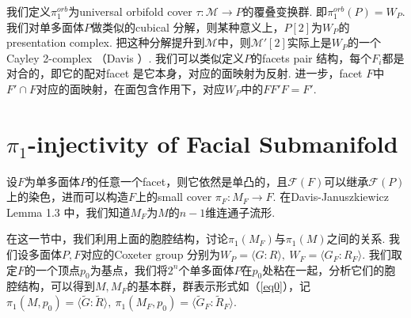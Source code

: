 \documentclass{article}
\theoremstyle{plain}%
\theoremstyle{definition}
\theoremstyle{remark}
\begin{document}
{我们定义$\pi_1^{orb}$为universal orbifold cover $\tau:\mathcal{M}\longrightarrow P$的覆叠变换群.
即$\pi_1^{orb}(P)=W_P$.
我们对单多面体$P$做类似的cubical 分解，则某种意义上，$P[2]$为$W_P$的presentation complex. 把这种分解提升到$\mathcal{M}$中，则$\mathcal{M}'[2]$实际上是$W_P$的一个 Cayley 2-complex （Davis \cite{D2}）. 我们可以类似定义$P$的facets pair 结构，每个$F_i$都是对合的，即它的配对facet 是它本身，对应的面映射为反射. 进一步，facet $F$中$F'\cap F$对应的面映射，在面包含作用下，对应$W_P$中的$FF'F=F'$.



 
 

\newpage
\section{$\pi_1$-injectivity of Facial Submanifold}
设$F$为单多面体$P$的任意一个facet，则它依然是单凸的，且$\mathcal{F}(F)$可以继承$\mathcal{F}(P)$上的染色，进而可以构造$F$上的small cover $\pi_F:M_F\longrightarrow F$. 在Davis-Januszkiewicz \cite{DJ1} Lemma 1.3 中，我们知道$M_F$为$M$的$n-1$维连通子流形. 

在这一节中，我们利用上面的胞腔结构，讨论$\pi_1(M_F)$与$\pi_1(M)$之间的关系. 我们设多面体$P,F$对应的Coxeter group 分别为$W_P=\langle G:R \rangle,~W_F=\langle G_F:R_F\rangle$.
我们取定$F$的一个顶点$p_0$为基点，我们将$2^n$个单多面体$P$在$p_0$处粘在一起，分析它们的胞腔结构，可以得到$M,M_F$的基本群，群表示形式如（\ref{eq0}），记$\pi_1(M,p_0)=\langle \widetilde{G}:\widetilde{R}\rangle,~\pi_1(M_F,p_0)=\langle \widetilde{G}_F:\widetilde{R}_F\rangle$. 

}
\end{document}

